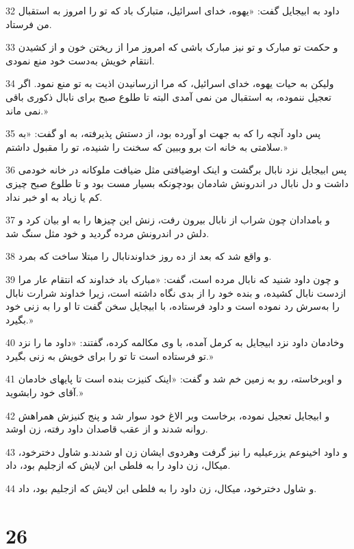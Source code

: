 \par 32 داود به ابیجایل گفت: «یهوه، خدای اسرائیل، متبارک باد که تو را امروز به استقبال من فرستاد.
\par 33 و حکمت تو مبارک و تو نیز مبارک باشی که امروز مرا از ریختن خون و از کشیدن انتقام خویش به‌دست خود منع نمودی.
\par 34 ولیکن به حیات یهوه، خدای اسرائیل، که مرا ازرسانیدن اذیت به تو منع نمود. اگر تعجیل ننموده، به استقبال من نمی آمدی البته تا طلوع صبح برای نابال ذکوری باقی نمی ماند.»
\par 35 پس داود آنچه را که به جهت او آورده بود، از دستش پذیرفته، به او گفت: «به سلامتی به خانه ات برو وببین که سخنت را شنیده، تو را مقبول داشتم.»
\par 36 پس ابیجایل نزد نابال برگشت و اینک اوضیافتی مثل ضیافت ملوکانه در خانه خودمی داشت و دل نابال در اندرونش شادمان بودچونکه بسیار مست بود و تا طلوع صبح چیزی کم یا زیاد به او خبر نداد.
\par 37 و بامدادان چون شراب از نابال بیرون رفت، زنش این چیزها را به او بیان کرد و دلش در اندرونش مرده گردید و خود مثل سنگ شد.
\par 38 و واقع شد که بعد از ده روز خداوندنابال را مبتلا ساخت که بمرد.
\par 39 و چون داود شنید که نابال مرده است، گفت: «مبارک باد خداوند که انتقام عار مرا ازدست نابال کشیده، و بنده خود را از بدی نگاه داشته است، زیرا خداوند شرارت نابال را به‌سرش رد نموده است و داود فرستاده، با ابیجایل سخن گفت تا او را به زنی خود بگیرد.»
\par 40 وخادمان داود نزد ابیجایل به کرمل آمده، با وی مکالمه کرده، گفتند: «داود ما را نزد تو فرستاده است تا تو را برای خویش به زنی بگیرد.»
\par 41 و اوبرخاسته، رو به زمین خم شد و گفت: «اینک کنیزت بنده است تا پایهای خادمان آقای خود رابشوید.»
\par 42 و ابیجایل تعجیل نموده، برخاست وبر الاغ خود سوار شد و پنج کنیزش همراهش روانه شدند و از عقب قاصدان داود رفته، زن اوشد.
\par 43 و داود اخینوعم یزرعیلیه را نیز گرفت وهردوی ایشان زن او شدند.و شاول دخترخود، میکال، زن داود را به فلطی ابن لایش که ازجلیم بود، داد.
\par 44 و شاول دخترخود، میکال، زن داود را به فلطی ابن لایش که ازجلیم بود، داد.
 
\chapter{26}


